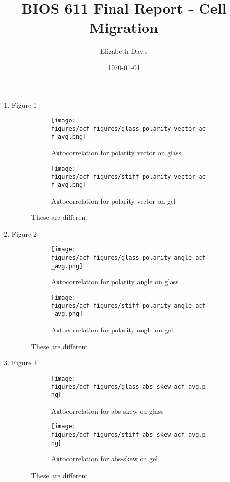 \documentclass[12pt]{article}
\title{BIOS 611 Final Report - Cell Migration}
\author{Elizabeth Davis}
\date{\today}
\begin{document}
\maketitle
\begin{enumerate}
\item Figure 1
\begin{figure}[h!]
    \centering
    \begin{subfigure}[b]{0.4\linewidth}
      \texttt{[image: figures/acf\_figures/glass\_polarity\_vector\_acf\_avg.png]}
      \caption{Autocorrelation for polarity vector on glass}
    \end{subfigure}
    \begin{subfigure}[b]{0.4\linewidth}
      \texttt{[image: figures/acf\_figures/stiff\_polarity\_vector\_acf\_avg.png]}
      \caption{Autocorrelation for polarity vector on gel}
    \end{subfigure}
    \caption{These are different}
    \label{fig:acf_polvec}
  \end{figure}

\item Figure 2
\begin{figure}[h!]
    \centering
    \begin{subfigure}[b]{0.4\linewidth}
      \texttt{[image: figures/acf\_figures/glass\_polarity\_angle\_acf\_avg.png]}
      \caption{Autocorrelation for polarity angle on glass}
    \end{subfigure}
    \begin{subfigure}[b]{0.4\linewidth}
      \texttt{[image: figures/acf\_figures/stiff\_polarity\_angle\_acf\_avg.png]}
      \caption{Autocorrelation for polarity angle on gel}
    \end{subfigure}
    \caption{These are different}
    \label{fig:acf_polang}
  \end{figure}

\item Figure 3
\begin{figure}[h!]
    \centering
    \begin{subfigure}[b]{0.4\linewidth}
      \texttt{[image: figures/acf\_figures/glass\_abs\_skew\_acf\_avg.png]}
      \caption{Autocorrelation for abs-skew on glass}
    \end{subfigure}
    \begin{subfigure}[b]{0.4\linewidth}
      \texttt{[image: figures/acf\_figures/stiff\_abs\_skew\_acf\_avg.png]}
      \caption{Autocorrelation for abs-skew on gel}
    \end{subfigure}
    \caption{These are different}
    \label{fig:acf_absskew}
  \end{figure}


\end{enumerate}
\end{document}
